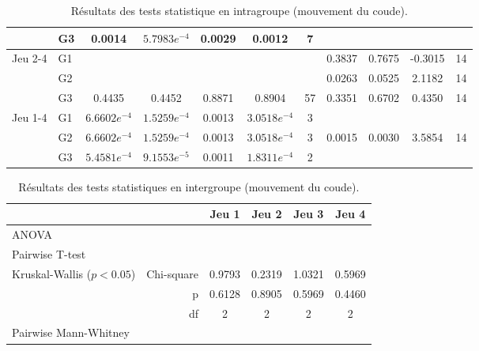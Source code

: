 {\begin{landscape}
\begin{table}[]
\begin{tabular}{ll|ccccc|cccc}
    & G3 & \cellcolor{green!25}0.0014 & \cellcolor{green!25}$5.7983e^{-4}$ & \cellcolor{green!25}0.0029 & \cellcolor{green!25}0.0012 & 7 &  &  &  &  \\ \hline
   \multirow{3}{*}{Jeu 2-4} & G1 &  &  &  &  &  & 0.3837 & 0.7675 & -0.3015 & 14 \\
    & G2 &  &  &  &  &  & \cellcolor{green!25} 0.0263 & 0.0525 & 2.1182 & 14 \\
    & G3 & 0.4435 & 0.4452 & 0.8871 & 0.8904 & 57 & 0.3351 & 0.6702 & 0.4350 & 14 \\ \hline
   \multirow{3}{*}{Jeu 1-4} & G1 & \cellcolor{green!25} $6.6602e^{-4}$ & \cellcolor{green!25} $1.5259e^{-4}$ & \cellcolor{green!25} 0.0013 & \cellcolor{green!25} $3.0518e^{-4}$ & 3 &  &  &  &  \\
    & G2 & \cellcolor{green!25} $6.6602e^{-4}$ & \cellcolor{green!25} $1.5259e^{-4}$ & \cellcolor{green!25} 0.0013 & \cellcolor{green!25} $3.0518e^{-4}$ & 3 & \cellcolor{green!25} 0.0015 & \cellcolor{green!25} 0.0030 & 3.5854 & 14 \\
    & G3 & \cellcolor{green!25} $5.4581e^{-4}$ & \cellcolor{green!25} $9.1553e^{-5}$ & \cellcolor{green!25} 0.0011 & \cellcolor{green!25} $1.8311e^{-4}$ & 2 &  &  &  &
   \end{tabular}
\caption{Résultats des tests statistique en intragroupe (mouvement du coude).}
\label{tab:elbow_move_intra}
\end{table}
\end{landscape}}

\begin{table}[]
\begin{tabular}{lr|cccc}
    &  & Jeu 1 & Jeu 2 & Jeu 3 & Jeu 4 \\\hline
    \multirow{2}{*}{ANOVA} &  &  &  &  &  \\
     &  &  &  &  &  \\\hline
    \multirow{3}{*}{Pairwise T-test} & & & & & \\
     & & & & &  \\
     & & & & &  \\\hline
\multirow{3}{*}{Kruskal-Wallis ($p < 0.05$)} & Chi-square & 0.9793 & 0.2319 & 1.0321 & 0.5969 \\
 & p & 0.6128 & 0.8905 & 0.5969 & 0.4460 \\
 & df & 2 & 2 & 2 & 2 \\\hline
 \multirow{3}{*}{Pairwise Mann-Whitney} & & & & & \\
 & & & & & \\
 & & & & &
\end{tabular}
\caption{Résultats des tests statistiques en intergroupe (mouvement du coude).}
\label{tab:elbow_move_inter}
\end{table}


